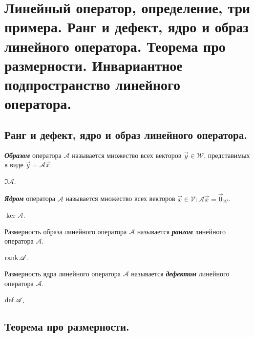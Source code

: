 \section{
    Линейный оператор, определение, три примера. Ранг и дефект, ядро и образ линейного оператора. Теорема про размерности. Инвариантное подпространство линейного оператора.  
}

\subsection{
    Ранг и дефект, ядро и образ линейного оператора.
}

\begin{definition}
    \textbf{\textit{Образом}} оператора $\mathscr{A}$ называется множество всех векторов $\vec{y} \in \mathcal{W}$, представимых в виде $\vec{y} = \mathscr{A}\vec{x}$.
\end{definition}

\begin{designation}
    $\Im \mathscr{A}$.
\end{designation}

\begin{definition}
    \textbf{\textit{Ядром}} оператора $\mathscr{A}$ называется множество всех векторов $\vec{x} \in \mathcal{V} \colon \mathscr{A}\vec{x} = \vec{0}_{\mathcal{W}}$.
\end{definition}

\begin{designation}
    $\ker \mathscr{A}$.
\end{designation}

\begin{definition}
    Размерность образа линейного оператора $\mathscr{A}$ называется \textbf{\textit{рангом}} линейного оператора $\mathscr{A}$. 
\end{definition}

\begin{designation}
    $\operatorname{\mathop{\mathrm{rank}}} \mathscr{A}$.
\end{designation}

\begin{definition}
    Размерность ядра линейного оператора $\mathscr{A}$ называется \textbf{\textit{дефектом}} линейного оператора $\mathscr{A}$. 
\end{definition}

\begin{designation}
    $\operatorname{\mathop{\mathrm{def}}} \mathscr{A}$.
\end{designation}

\subsection{
    Теорема про размерности.
}

